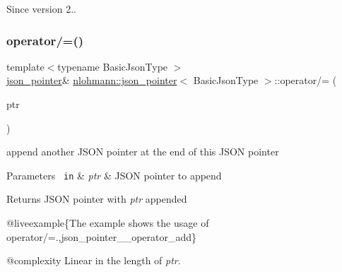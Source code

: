 \begin{DoxySince}{Since}
version 2.. 
\end{DoxySince}
\mbox{\label{classnlohmann_1_1json__pointer_a7395bd0af29ac23fd3f21543c935cdfa}} 
\subsubsection{\texorpdfstring{operator/=()}{operator/=()}\hspace{0.1cm}{\footnotesize\ttfamily [1/3]}}
{\footnotesize\ttfamily template$<$typename Basic\+Json\+Type $>$ \\
\mbox{\hyperlink{classnlohmann_1_1json__pointer}{json\+\_\+pointer}}\& \mbox{\hyperlink{classnlohmann_1_1json__pointer}{nlohmann\+::json\+\_\+pointer}}$<$ Basic\+Json\+Type $>$\+::operator/= (\begin{DoxyParamCaption}\item[{const \mbox{\hyperlink{classnlohmann_1_1json__pointer}{json\+\_\+pointer}}$<$ Basic\+Json\+Type $>$ \&}]{ptr }\end{DoxyParamCaption})\hspace{0.3cm}{\ttfamily [inline]}}



append another J\+S\+ON pointer at the end of this J\+S\+ON pointer 


\begin{DoxyParams}[1]{Parameters}
\mbox{\texttt{ in}}  & {\em ptr} & J\+S\+ON pointer to append \\
\hline
\end{DoxyParams}
\begin{DoxyReturn}{Returns}
J\+S\+ON pointer with {\itshape ptr} appended
\end{DoxyReturn}
@liveexample\{The example shows the usage of {\ttfamily operator/=}.,json\+\_\+pointer\+\_\+\+\_\+operator\+\_\+add\}

@complexity Linear in the length of {\itshape ptr}.

